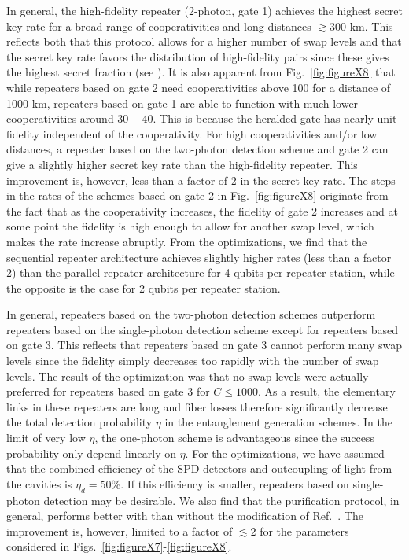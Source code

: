 In general, the high-fidelity repeater (2-photon, gate 1) achieves the highest
secret key rate for a broad range of cooperativities and long distances $\gtrsim
300$ km. This reflects both that this protocol allows for a higher number of
swap levels and that the secret key rate favors the distribution of
high-fidelity pairs since these gives the highest secret fraction (see
). It is also apparent from Fig.~\ref{fig:figureX8} that
while repeaters based on gate 2 need cooperativities above 100 for a distance of
1000 km, repeaters based on gate 1 are able to function with much lower
cooperativities around $30-40$. This is because the heralded gate has nearly
unit fidelity independent of the cooperativity. For high cooperativities and/or
low distances, a repeater based on the two-photon detection scheme and gate 2
can give a slightly higher secret key rate than the high-fidelity repeater. This
improvement is, however, less than a factor of 2 in the secret key rate. The
steps in the rates of the schemes based on gate 2 in Fig.~\ref{fig:figureX8}
originate from the fact that as the cooperativity increases, the fidelity of
gate 2 increases and at some point the fidelity is high enough to allow for
another swap level, which makes the rate increase abruptly.
From the optimizations, we find that the sequential repeater architecture
achieves slightly higher rates (less than a factor 2) than the parallel repeater
architecture for 4 qubits per repeater station, while the opposite is the case
for 2 qubits per repeater station.

In general, repeaters based on the two-photon detection schemes outperform
repeaters based on the single-photon detection scheme except for repeaters based
on gate 3. This reflects that repeaters based on gate 3 cannot perform many swap
levels since the fidelity simply decreases too rapidly with the number of swap
levels. The result of the optimization was that no swap levels were actually
preferred for repeaters based on gate 3 for $C\leq1000$.  As a result, the
elementary links in these repeaters are long and fiber losses therefore
significantly decrease the total detection probability $\eta$ in the
entanglement generation schemes. In the limit of very low $\eta$, the one-photon
scheme is advantageous since the success probability only depend linearly on
$\eta$. For the optimizations, we have assumed that the combined efficiency of
the SPD detectors and outcoupling of light from the cavities is $\eta_{d}=$50\%.
If this efficiency is smaller, repeaters based on single-photon detection may be
desirable. We also find that the purification protocol, in general, performs
better with than without the modification of Ref.~\cite{nickerson}. The
improvement is, however, limited to a factor of $\lesssim2$ for the parameters
considered in Figs.~\ref{fig:figureX7}-\ref{fig:figureX8}.


